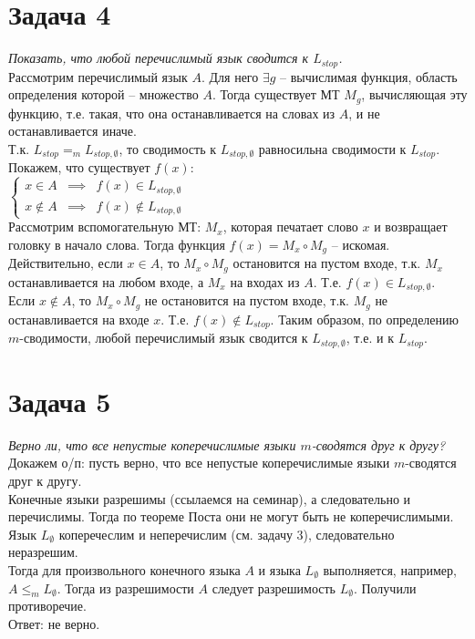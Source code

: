 \documentclass{article}
\begin{document}
\section*{Задача 4}

\textit{Показать, что любой перечислимый язык сводится к $L_{stop}$.}\\

Рассмотрим перечислимый язык $ A $. Для него $ \exists g $ -- вычислимая функция, область определения которой -- множество $ A $. Тогда существует МТ $ M_g $, вычисляющая эту функцию, т.е. такая, что она останавливается на словах из $ A $, и не останавливается иначе.\\
Т.к. $L_{stop} =_m L_{stop, \emptyset}$, то сводимость к $L_{stop, \emptyset}$ равносильна сводимости к $L_{stop}$. Покажем, что существует $f(x)$:\\
$\left \{\begin{array}{ccc} x \in A & \implies & f(x) \in L_{stop, \emptyset} \\ x \not \in A & \implies & f(x) \not \in L_{stop, \emptyset} \end{array}\right.$\\
Рассмотрим вспомогательную МТ: $ M_x $, которая печатает слово $x$ и возвращает головку в начало слова. Тогда функция $ f(x) = M_x \circ M_g $ -- искомая. Действительно, 
если $ x\in A $, то $M_x \circ M_g$ остановится на пустом входе, т.к. $M_x$ останавливается на любом входе, а  $M_x$ на входах из $A$. Т.е.  $f(x) \in L_{stop, \emptyset} $.\\
Если $ x\notin A$, то $M_x \circ M_g$ не остановится на пустом входе, т.к. $M_g$ не останавливается на входе $x$. Т.е. $ f(x)\notin L_{stop} $.
Таким образом, по определению $m$-сводимости, любой перечислимый язык сводится к $ L_{stop, \emptyset} $, т.е. и к $L_{stop}$.

\section*{Задача 5}

\textit{Верно ли, что все непустые коперечислимые языки $m$-сводятся друг к другу?}\\

Докажем о/п: пусть верно, что все непустые коперечислимые языки $m$-сводятся друг к другу.\\
Конечные языки разрешимы (ссылаемся на семинар), а следовательно и перечислимы. Тогда по теореме Поста они не могут быть не коперечислимыми.\\
Язык $L_\emptyset$ коперечеслим и неперечислим (см. задачу 3), следовательно неразрешим. \\
Тогда для произвольного конечного языка $A$ и языка $L_\emptyset$ выполняется, например, $A \leq_m L_{\emptyset}$. Тогда из разрешимости $A$ следует разрешимость $L_\emptyset$. Получили противоречие.\\
Ответ: не верно.
\end{document}
